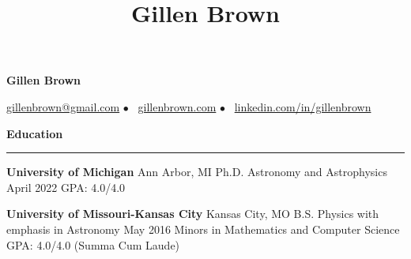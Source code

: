 \documentclass[10pt]{article}
\title{Gillen Brown}
\newcommand{\todo}[1]{\textcolor{red}{[\bf #1]}}
\newcommand{\spacer}{$\bullet$ \ }
\newcommand{\header}[1]{\vspace{1.5em}\par \textbf{\large #1}\strut\hrule\vspace{-0.9em}}
\newcommand{\actionHeader}[2]{\vspace{0.6em}\textbf{#1} \hfill #2}
\newcommand{\indentedItemDate}[2]{\newline\null\qquad #1 \hfill #2}
\newcommand{\indentedItem}[1]{\newline\null\qquad #1}
\begin{document}
\thispagestyle{empty}


\begin{center}
{\LARGE \bf Gillen Brown}

{\normalsize \href{mailto:gillenbrown@gmail.com}{gillenbrown@gmail.com} \spacer \href{https://www.gillenbrown.com}{gillenbrown.com} \spacer \href{http://www.linkedin.com/in/gillenbrown}{linkedin.com/in/gillenbrown}}
\end{center}


\vspace{1em}
\header{Education}
\actionHeader{University of Michigan}{Ann Arbor, MI}
\indentedItemDate{Ph.D. Astronomy and Astrophysics}{April 2022}
\indentedItem{GPA: 4.0/4.0}
\vspace{-0.5em}

\actionHeader{University of Missouri-Kansas City}{Kansas City, MO}
\indentedItemDate{B.S. Physics with emphasis in Astronomy}{May 2016}
\indentedItem{Minors in Mathematics and Computer Science}
\indentedItem{GPA: 4.0/4.0  (Summa Cum Laude)}
\vspace{-0.3em}
\end{document}
